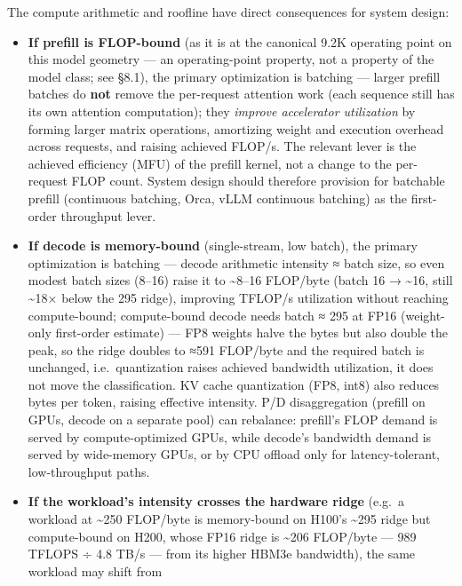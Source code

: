 \label{architecture-consequence}


The compute arithmetic and roofline have direct consequences for system
design:

\begin{itemize}
\item
  \textbf{If prefill is FLOP-bound} (as it is at the canonical 9.2K
  operating point on this model geometry --- an operating-point
  property, not a property of the model class; see §8.1), the primary
  optimization is batching --- larger prefill batches do \textbf{not}
  remove the per-request attention work (each sequence still has its own
  attention computation); they \emph{improve accelerator utilization} by
  forming larger matrix operations, amortizing weight and execution
  overhead across requests, and raising achieved FLOP/s. The relevant
  lever is the achieved efficiency (MFU) of the prefill kernel, not a
  change to the per-request FLOP count. System design should therefore
  provision for batchable prefill (continuous batching, Orca, vLLM
  continuous batching) as the first-order throughput lever.
\item
  \textbf{If decode is memory-bound} (single-stream, low batch), the
  primary optimization is batching --- decode arithmetic intensity ≈
  batch size, so even modest batch sizes (8--16) raise it to
  \textasciitilde8--16 FLOP/byte (batch 16 → \textasciitilde16, still
  \textasciitilde18× below the 295 ridge), improving TFLOP/s utilization
  without reaching compute-bound; compute-bound decode needs batch ≈ 295
  at FP16 (weight-only first-order estimate) --- FP8 weights halve the
  bytes but also double the peak, so the ridge doubles to ≈591 FLOP/byte
  and the required batch is unchanged, i.e.~quantization raises achieved
  bandwidth utilization, it does not move the classification. KV cache
  quantization (FP8, int8) also reduces bytes per token, raising
  effective intensity. P/D disaggregation (prefill on GPUs, decode on a
  separate pool) can rebalance: prefill's FLOP demand is served by
  compute-optimized GPUs, while decode's bandwidth demand is served by
  wide-memory GPUs, or by CPU offload only for latency-tolerant,
  low-throughput paths.
\item
  \textbf{If the workload's intensity crosses the hardware ridge}
  (e.g.~a workload at \textasciitilde250 FLOP/byte is memory-bound on
  H100's \textasciitilde295 ridge but compute-bound on H200, whose FP16
  ridge is \textasciitilde206 FLOP/byte --- 989 TFLOPS ÷ 4.8 TB/s ---
  from its higher HBM3e bandwidth), the same workload may shift from

\end{itemize}
